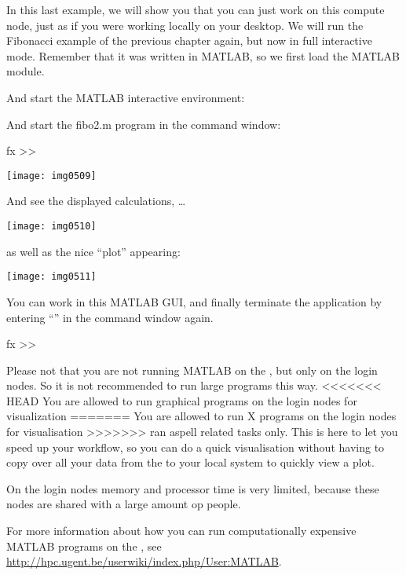 In this last example, we will show you that you can just work on this compute
node, just as if you were working locally on your desktop.  We will run the
Fibonacci example of the previous chapter again, but now in full interactive
mode. Remember that it was written in MATLAB, so we first load the MATLAB
module.

\begin{prompt}
\end{prompt}

And start the MATLAB interactive environment:

\begin{prompt}
\end{prompt}

And start the fibo2.m program in the command window:
\begin{prompt}
fx >> %
\end{prompt}

\texttt{[image: img0509]}

And see the displayed calculations, \dots

\texttt{[image: img0510]}

as well as the nice ``plot'' appearing:

\texttt{[image: img0511]}

You can work in this MATLAB GUI, and finally terminate the application by
entering ``'' in the command window again.

\begin{prompt}
fx >> %
\end{prompt}


Please not that you are not running MATLAB on the \hpc, but only on the
login nodes. So it is not recommended to run large programs this way.
<<<<<<< HEAD
You are allowed to run graphical programs on the login nodes for visualization
=======
You are allowed to run X programs on the login nodes for visualisation
>>>>>>> ran aspell
related tasks only. This is here to let you speed up your workflow,
so you can do a quick visualisation without having to copy over all your data
from the \hpc to your local system to quickly view a plot.

On the login nodes memory and processor time is very limited, because these
nodes are shared with a large amount op people.

\ifgent
For more information about how you can run computationally expensive
MATLAB programs on the \hpc, see \url{http://hpc.ugent.be/userwiki/index.php/User:MATLAB}.
\fi
